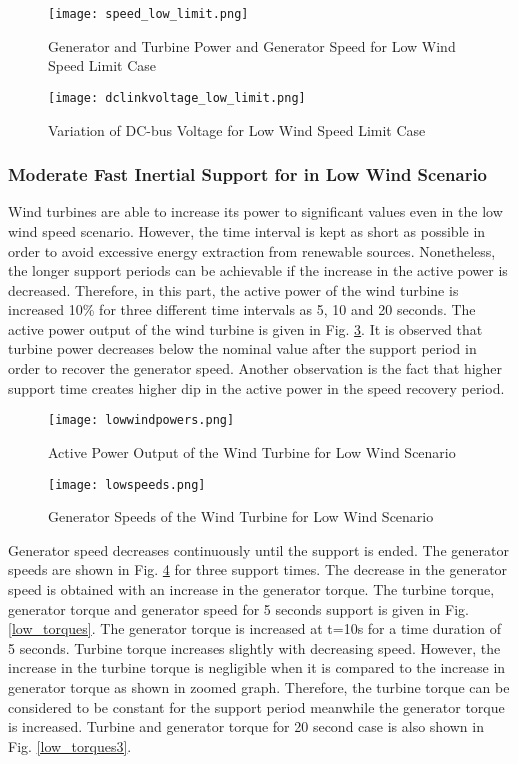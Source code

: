 \begin{figure}[h]
	\centering
	\texttt{[image: speed\_low\_limit.png]}
	\caption{Generator and Turbine Power and Generator Speed for Low Wind Speed Limit Case}
	\label{low_limit_speed}
\end{figure}
\begin{figure}[h]
	\centering
	\texttt{[image: dclinkvoltage\_low\_limit.png]}
	\caption{Variation of DC-bus Voltage for Low Wind Speed Limit Case}
	\label{low_limit_dc-bus}
\end{figure}
\subsubsection{Moderate Fast Inertial Support for in Low Wind Scenario}
Wind turbines are able to increase its power to significant values even in the low wind speed scenario. However, the time interval is kept as short as possible in order to avoid excessive energy extraction from renewable sources. Nonetheless, the longer support periods can be achievable if the increase in the active power is decreased. Therefore, in this part, the active power of the wind turbine is increased 10\% for three different time intervals as 5, 10 and 20 seconds. The active power output of the wind turbine is given in Fig. \ref{lowactivepowers}. It is observed that turbine power decreases below the nominal value after the support period in order to recover the generator speed. Another observation is the fact that higher support time creates higher dip in the active power in the speed recovery period.\par
\begin{figure}[h]
	\centering
	\texttt{[image: lowwindpowers.png]}
	\caption{Active Power Output of the Wind Turbine for Low Wind Scenario}
	\label{lowactivepowers}
\end{figure}
\begin{figure}[h]
	\centering
	\texttt{[image: lowspeeds.png]}
	\caption{Generator Speeds of the Wind Turbine for Low Wind Scenario}
	\label{low_speeds}
\end{figure}
Generator speed decreases continuously until the support is ended. The generator speeds are shown in Fig. \ref{low_speeds} for three support times. The decrease in the generator speed is obtained with an increase in the generator torque. The turbine torque, generator torque and generator speed for 5 seconds support is given in Fig. \ref{low_torques}. The generator torque is increased at t=10s for a time duration of 5 seconds. Turbine torque increases slightly with decreasing speed. However, the increase in the turbine torque is negligible when it is compared to the increase in generator torque as shown in zoomed graph. Therefore, the turbine torque can be considered to be constant for the support period meanwhile the generator torque is increased. Turbine and generator torque for 20 second case is also shown in Fig. \ref{low_torques3}.\par
